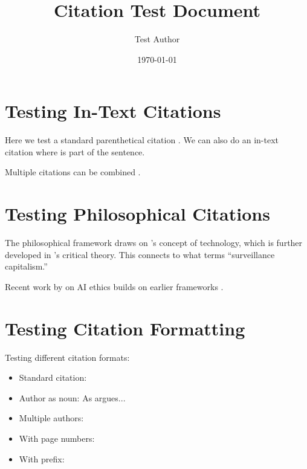 \documentclass[12pt]{article}
\title{Citation Test Document}
\author{Test Author}
\date{\today}
\begin{document}
\maketitle

\section{Testing In-Text Citations}

Here we test a standard parenthetical citation \parencite{smith2023}. We can also do an 
in-text citation where \textcite{march1991} is part of the sentence.

Multiple citations can be combined \parencite{chen2022,johnson2024,kellogg2020}.

\section{Testing Philosophical Citations}

The philosophical framework draws on \textcite{heidegger1977}'s concept of technology, 
which is further developed in \textcite{feenberg2019}'s critical theory. This connects to 
what \textcite{zuboff2019} terms ``surveillance capitalism.''

Recent work by \textcite{crawford2021} on AI ethics builds on earlier frameworks 
\parencite{floridi2019,coeckelbergh2020}.

\section{Testing Citation Formatting}

Testing different citation formats:
\begin{itemize}
    \item Standard citation: \parencite{parker2016}
    \item Author as noun: As \textcite{hansen1999} argues...
    \item Multiple authors: \parencite{hardt2017,harvey2018,lapavitsas2013}
    \item With page numbers: \parencite[p.~84]{moore2016}
    \item With prefix: \parencite[see][]{stiegler2018}
\end{itemize}

\printbibliography
\end{document}
